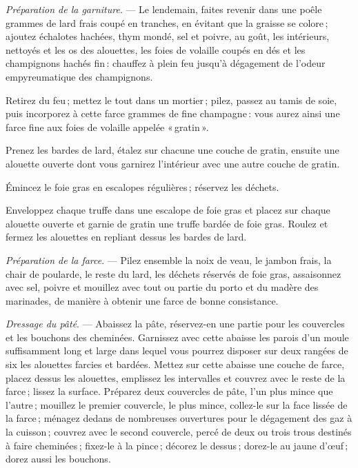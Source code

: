 \medskip

\textit{Préparation de la garniture}. — Le lendemain, faites revenir dans une
poêle {\mmm} grammes de lard frais coupé en tranches, en évitant que la
graisse se colore ; ajoutez échalotes hachées, thym mondé, sel et poivre, au
goût, les intérieurs, nettoyés et les os des alouettes, les foies de volaille
coupés en dés et les champignons hachés fin : chauffez à plein feu jusqu'à
dégagement de l'odeur empyreumatique des champignons.

Retirez du feu ; mettez le tout dans un mortier ; pilez, passez au tamis de
soie, puis incorporez à cette farce {\mmm} grammes de fine champagne :
vous aurez ainsi une farce fine aux foies de volaille appelée « gratin ».

Prenez les bardes de lard, étalez sur chacune une couche de gratin, ensuite
une alouette ouverte dont vous garnirez l'intérieur avec une autre couche de
gratin.

Émincez le foie gras en {\mmm} escalopes régulières ; réservez les
déchets.

Enveloppez chaque truffe dans une escalope de foie gras et placez sur chaque
alouette ouverte et garnie de gratin une truffe bardée de foie gras. Roulez et
fermez les alouettes en repliant dessus les bardes de lard.

\medskip

\label{pg0613} \hypertarget{p0613}{}
\textit{Préparation de la farce}. — Pilez ensemble la noix de veau, le jambon
frais, la chair de poularde, le reste du lard, les déchets réservés de foie
gras, assaisonnez avec sel, poivre et mouillez avec tout ou partie du porto et
du madère des marinades, de manière à obtenir une farce de bonne consistance.

\smallskip

\textit{Dressage du pâté}. — Abaissez la pâte, réservez-en une partie pour les
couvercles et les bouchons des cheminées. Garnissez avec cette abaisse les
parois d'un moule suffisamment long et large dans lequel vous pourrez disposer
sur deux rangées de six les alouettes farcies et bardées. Mettez sur cette
abaisse une couche de farce, placez dessus les alouettes, emplissez les
intervalles et couvrez avec le reste de la farce ; lissez la surface. Préparez
deux couvercles de pâte, l'un plus mince que l’autre ; mouillez le premier
couvercle, le plus mince, collez-le sur la face lissée de la farce ; ménagez
dedans de nombreuses ouvertures pour le dégagement des gaz à la cuisson ;
couvrez avec le second couvercle, percé de deux ou trois trous destinés à faire
cheminées ; fixez-le à la pince ; décorez le dessus ; dorez-le au jaune d'œuf ;
dorez aussi les bouchons.

